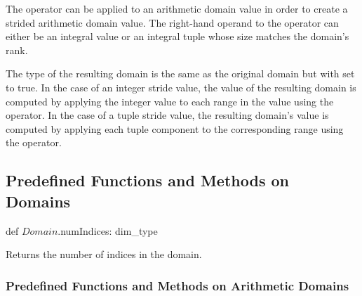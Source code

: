 The  operator can be applied to an arithmetic domain value in
order to create a strided arithmetic domain value.  The right-hand
operand to the  operator can either be an integral value or
an integral tuple whose size matches the domain's rank.


The type of the resulting domain is the same as the original domain
but with  set to true.  In the case of an integer
stride value, the value of the resulting domain is computed by
applying the integer value to each range in the value using the
 operator.  In the case of a tuple stride value, the resulting
domain's value is computed by applying each tuple component to the
corresponding range using the  operator.



\subsection{Predefined Functions and Methods on Domains}

\begin{protohead}
def $Domain$.numIndices: dim_type
\end{protohead}
\begin{protobody}
Returns the number of indices in the domain.
\end{protobody}



\subsubsection{Predefined Functions and Methods on Arithmetic Domains}

